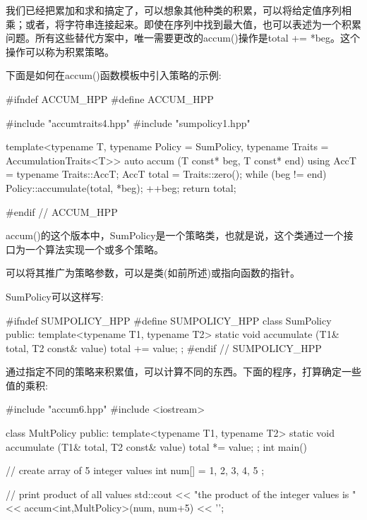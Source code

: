 
我们已经把累加和求和搞定了，可以想象其他种类的积累，可以将给定值序列相乘；或者，将字符串连接起来。即使在序列中找到最大值，也可以表述为一个积累问题。所有这些替代方案中，唯一需要更改的accum()操作是total += *beg。这个操作可以称为积累策略。

下面是如何在accum()函数模板中引入策略的示例:

\begin{cpp}
#ifndef ACCUM_HPP
#define ACCUM_HPP

#include "accumtraits4.hpp"
#include "sumpolicy1.hpp"

template<typename T,
		typename Policy = SumPolicy,
		typename Traits = AccumulationTraits<T>>
auto accum (T const* beg, T const* end)
{
	using AccT = typename Traits::AccT;
	AccT total = Traits::zero();
	while (beg != end) {
		Policy::accumulate(total, *beg);
		++beg;
	}
	return total;
}

#endif // ACCUM_HPP
\end{cpp}

accum()的这个版本中，SumPolicy是一个策略类，也就是说，这个类通过一个接口为一个算法实现一个或多个策略。

\begin{notice}可以将其推广为策略参数，可以是类(如前所述)或指向函数的指针。
\end{notice}

SumPolicy可以这样写:

\begin{cpp}
#ifndef SUMPOLICY_HPP
#define SUMPOLICY_HPP
class SumPolicy {
	public:
	template<typename T1, typename T2>
	static void accumulate (T1& total, T2 const& value) {
		total += value;
	}
};
#endif // SUMPOLICY_HPP
\end{cpp}

通过指定不同的策略来积累值，可以计算不同的东西。下面的程序，打算确定一些值的乘积:

\begin{cpp}
#include "accum6.hpp"
#include <iostream>

class MultPolicy {
	public:
	template<typename T1, typename T2>
	static void accumulate (T1& total, T2 const& value) {
		total *= value;
	}
};
int main()
{
	// create array of 5 integer values
	int num[] = { 1, 2, 3, 4, 5 };
	
	// print product of all values
	std::cout << "the product of the integer values is "
			<< accum<int,MultPolicy>(num, num+5)
			<< ’\n’;
}
\end{cpp}

